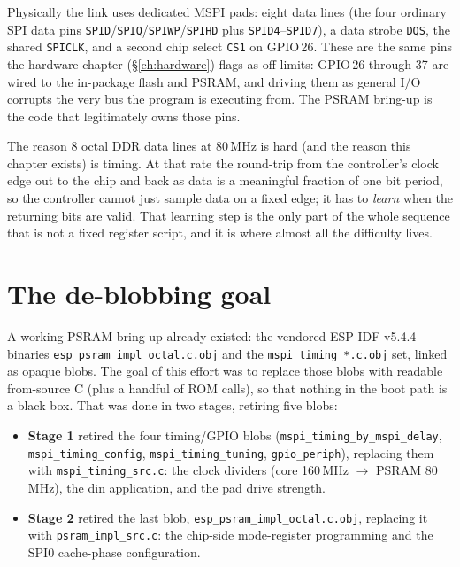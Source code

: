 Physically the link uses dedicated MSPI pads: eight data lines (the four ordinary
SPI data pins \texttt{SPID}/\texttt{SPIQ}/\texttt{SPIWP}/\texttt{SPIHD} plus
\texttt{SPID4}--\texttt{SPID7}), a data strobe \texttt{DQS}, the shared
\texttt{SPICLK}, and a second chip select \texttt{CS1} on GPIO\,26. These are the
same pins the hardware chapter (\S\ref{ch:hardware}) flags as off-limits: GPIO\,26
through 37 are wired to the in-package flash and PSRAM, and driving them as general
I/O corrupts the very bus the program is executing from. The PSRAM bring-up is the
code that legitimately owns those pins.

The reason 8 octal DDR data lines at 80\,MHz is hard (and the reason this chapter
exists) is timing. At that rate the round-trip from the controller's clock edge
out to the chip and back as data is a meaningful fraction of one bit period, so the
controller cannot just sample data on a fixed edge; it has to \emph{learn} when the
returning bits are valid. That learning step is the only part of the whole sequence
that is not a fixed register script, and it is where almost all the difficulty lives.

\section{The de-blobbing goal}

A working PSRAM bring-up already existed: the vendored ESP-IDF v5.4.4 binaries
\texttt{esp\_psram\_impl\_octal.c.obj} and the \texttt{mspi\_timing\_*.c.obj} set,
linked as opaque blobs. The goal of this effort was to replace those blobs with
readable from-source C (plus a handful of ROM calls), so that nothing in the boot
path is a black box. That was done in two stages, retiring five blobs:

\begin{itemize}
\item \textbf{Stage 1} retired the four timing/GPIO blobs
(\texttt{mspi\_timing\_by\_mspi\_delay}, \texttt{mspi\_timing\_config},
\texttt{mspi\_timing\_tuning}, \texttt{gpio\_periph}), replacing them with
\texttt{mspi\_timing\_src.c}: the clock dividers (core 160\,MHz $\rightarrow$ PSRAM
80\,MHz), the din application, and the pad drive strength.
\item \textbf{Stage 2} retired the last blob,
\texttt{esp\_psram\_impl\_octal.c.obj}, replacing it with
\texttt{psram\_impl\_src.c}: the chip-side mode-register programming and the SPI0
cache-phase configuration.
\end{itemize}

